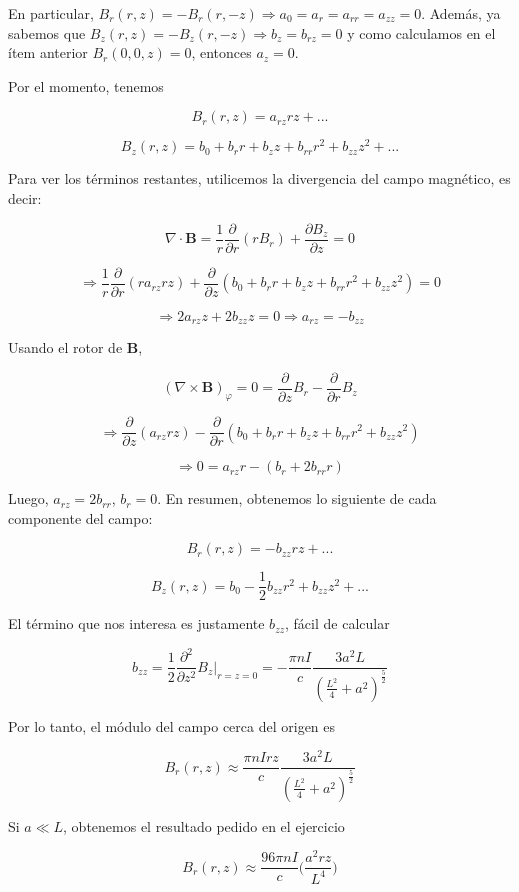 \begin{itemize}
En particular, $B_{r}(r, z) = -B_{r}(r, -z) \Rightarrow a_{0} = a_{r} = a_{rr} = a_{zz} = 0$. Adem\'as, ya sabemos que $B_{z}(r, z) = -B_{z}(r, -z) \Rightarrow b_{z} = b_{rz} = 0$ y como calculamos en el \'item anterior $B_{r}(0, 0, z) = 0$, entonces $a_{z} = 0$. \newline

Por el momento, tenemos

$$B_{r}(r, z) = a_{rz}rz + ...$$

$$B_{z}(r, z) = b_{0} + b_{r}r + b_{z}z + b_{rr}r^{2} + b_{zz}z^{2} + ...$$

Para ver los t\'erminos restantes, utilicemos la divergencia del campo magn\'etico, es decir:

$$\nabla \cdot \mathbf{B} = \frac{1}{r}\frac{\partial}{\partial r}(rB_{r}) + \frac{\partial B_{z}}{\partial z} = 0$$

$$\Rightarrow \frac{1}{r}\frac{\partial}{\partial r}(ra_{rz}rz) + \frac{\partial}{\partial z}(b_{0} + b_{r}r + b_{z}z + b_{rr}r^{2} + b_{zz}z^{2}) = 0$$

$$\Rightarrow 2a_{rz}z + 2b_{zz}z = 0 \Rightarrow a_{rz} = -b_{zz}$$

Usando el rotor de $\mathbf{B}$,

$$(\nabla \times \mathbf{B})_{\varphi} = 0 = \frac{\partial}{\partial z}B_{r} - \frac{\partial}{\partial r}B_{z}$$

$$\Rightarrow \frac{\partial}{\partial z}(a_{rz}rz) - \frac{\partial}{\partial r}(b_{0} + b_{r}r + b_{z}z + b_{rr}r^{2} + b_{zz}z^{2})$$

$$\Rightarrow 0 = a_{rz}r - (b_{r} + 2b_{rr}r)$$

Luego, $a_{rz} = 2b_{rr}$, $b_{r} = 0$. En resumen, obtenemos lo siguiente de cada componente del campo:

$$B_{r}(r, z) = -b_{zz}rz + ...$$

$$B_{z}(r, z) = b_{0} -\frac{1}{2}b_{zz}r^{2} + b_{zz}z^{2} + ...$$

El t\'ermino que nos interesa es justamente $b_{zz}$, f\'acil de calcular

$$b_{zz} = \frac{1}{2}\frac{\partial^{2}}{\partial z^{2}}B_{z}|_{r = z = 0} = -\frac{\pi n I}{c}\frac{3a^{2}L}{(\frac{L^{2}}{4} + a^{2})^{\frac{5}{2}}}$$

Por lo tanto, el m\'odulo del campo cerca del origen es

$$B_{r}(r, z) \approx \frac{\pi n I r z}{c}\frac{3a^{2}L}{(\frac{L^{2}}{4} + a^{2})^{\frac{5}{2}}}$$

Si $a \ll L$, obtenemos el resultado pedido en el ejercicio

$$B_{r}(r, z) \approx \frac{96\pi n I}{c}\bigg( \frac{a^{2}rz}{L^{4}}\bigg)$$

\end{itemize}

